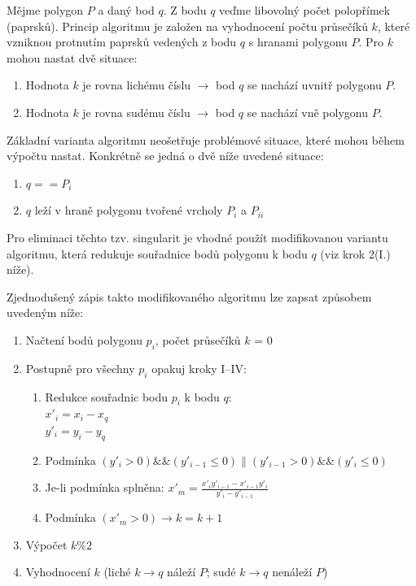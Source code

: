 \documentclass[a4paper, 12pt]{article}
\begin{document}
Mějme polygon $P$ a daný bod $q$. Z bodu $q$ veďme libovolný počet polopřímek (paprsků). Princip algoritmu je založen na vyhodnocení počtu průsečíků $k$, které vzniknou protnutím paprsků vedených z bodu $q$ s hranami polygonu $P$. Pro $k$ mohou nastat dvě situace:
\begin{enumerate}
\item Hodnota $k$ je rovna lichému číslu $\rightarrow$ bod $q$ se nachází uvnitř polygonu $P$.
\item Hodnota $k$ je rovna sudému číslu $\rightarrow$ bod $q$ se nachází vně polygonu $P$.
\end{enumerate}

Základní varianta algoritmu neošetřuje problémové situace, které mohou během výpočtu nastat. Konkrétně se jedná o dvě níže uvedené situace:

\begin{enumerate}
\item $q == P_i$
\item $q$ leží v hraně polygonu tvořené vrcholy $P_i$ a $P_{ii}$
\end{enumerate}

Pro eliminaci těchto tzv. singularit je vhodné použít modifikovanou variantu algoritmu, která redukuje souřadnice bodů polygonu k bodu $q$ (viz krok 2(I.) níže). 

Zjednodušený zápis takto modifikovaného algoritmu lze zapsat způsobem uvedeným níže:
\begin{enumerate}
\item Načtení bodů polygonu $p_i$, počet průsečíků $k$ = 0
\item Postupně pro všechny $p_i$ opakuj kroky I–IV:
\begin{enumerate}[label=\Roman*.]
\item 	Redukce souřadnic bodu $p_i$ k bodu $q$:\\
$x'_i = x_i - x_q$\\
$y'_i = y_i - y_q$
\item 	Podmínka $(y'_i > 0)\&\&(y'_{i-1} \leq 0)\|(y'_{i-1} > 0)\&\&(y'_{i} \leq 0)$
\item 	Je-li podmínka splněna: $x'_m = \frac{x'_i y'_{i-1} - x'_{i-1} y'_i}{y'_i - y'_{i-1}}$
\item Podmínka $(x'_m > 0) \rightarrow k = k + 1$ 
\end{enumerate}
\item Výpočet $k\%2$
\item Vyhodnocení $k$ (liché $k \rightarrow q$ náleží $P$; sudé $k \rightarrow q$ nenáleží $P$)
\end{enumerate}
\end{document}
